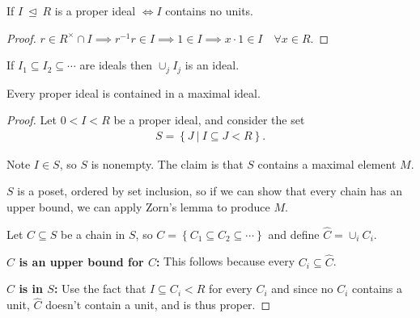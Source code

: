 \begin{proposition}

If \(I{~\trianglelefteq~}R\) is a proper ideal \(\iff I\) contains no
units.

\end{proposition}

\begin{proof}

\(r\in R^{\times}\cap I \implies r^{-1}r \in I \implies 1\in I \implies x\cdot 1 \in I \quad \forall x\in R\).

\end{proof}

\begin{proposition}

If \(I_1 \subseteq I_2 \subseteq \cdots\) are ideals then \(\cup_j I_j\)
is an ideal.

\end{proposition}

\begin{proposition}

Every proper ideal is contained in a maximal ideal.

\end{proposition}

\begin{proof}

Let \(0 < I < R\) be a proper ideal, and consider the set
\begin{align*}
S = \left\{{J {~\mathrel{\Big|}~}I   \subseteq J < R}\right\}
.\end{align*}

Note \(I\in S\), so \(S\) is nonempty. The claim is that \(S\) contains
a maximal element \(M\).

\(S\) is a poset, ordered by set inclusion, so if we can show that every
chain has an upper bound, we can apply Zorn's lemma to produce \(M\).

Let \(C \subseteq S\) be a chain in \(S\), so
\(C = \left\{{C_1 \subseteq C_2 \subseteq \cdots}\right\}\) and define
\(\widehat{C} = \cup_i C_i\).

\textbf{\(\widehat{C}\) is an upper bound for \(C\):} This follows
because every \(C_i \subseteq \widehat{C}\).

\textbf{\(\widehat{C}\) is in \(S\):} Use the fact that
\(I \subseteq C_i < R\) for every \(C_i\) and since no \(C_i\) contains
a unit, \(\widehat{C}\) doesn't contain a unit, and is thus proper.

\end{proof}

